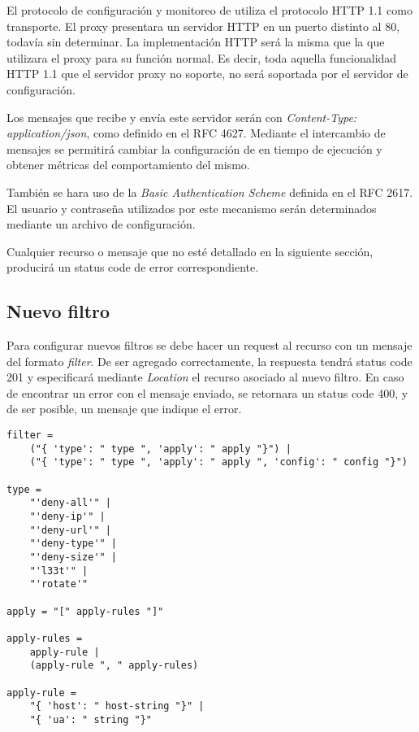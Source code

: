 \documentclass[11pt,a4paper,titlepage]{article}
\begin{document}
El protocolo de configuración y monitoreo de \duta utiliza el protocolo HTTP 1.1 como transporte.
El proxy presentara un servidor HTTP en un puerto distinto al 80, todavía sin determinar.
La implementación HTTP será la misma que la que utilizara el proxy para su función normal.
Es decir, toda aquella funcionalidad HTTP 1.1 que el servidor proxy no soporte, no será soportada por el servidor de configuración.

Los mensajes que recibe y envía este servidor serán con \textit{Content-Type: application/json}, como definido en el RFC 4627.
Mediante el intercambio de mensajes se permitirá cambiar la configuración de \duta en tiempo de ejecución y obtener métricas del comportamiento del mismo.

También se hara uso de la \textit{Basic Authentication Scheme} definida en el RFC 2617.
El usuario y contraseña utilizados por este mecanismo serán determinados mediante un archivo de configuración.

Cualquier recurso o mensaje que no esté detallado en la siguiente sección, producirá un status code de error correspondiente.

\subsection{Nuevo filtro}
\label{sec:new-filter}
Para configurar nuevos filtros se debe hacer un request  al recurso  con un mensaje del formato \textit{filter}.
De ser agregado correctamente, la respuesta tendrá status code 201 y especificará mediante \textit{Location} el recurso asociado al nuevo filtro.
En caso de encontrar un error con el mensaje enviado, se retornara un status code 400, y de ser posible, un mensaje que indique el error.

\begin{verbatim}
filter = 
    ("{ 'type': " type ", 'apply': " apply "}") | 
    ("{ 'type': " type ", 'apply': " apply ", 'config': " config "}")

type = 
    "'deny-all'" |
    "'deny-ip'" |
    "'deny-url'" |
    "'deny-type'" |
    "'deny-size'" |
    "'l33t'" |
    "'rotate'"

apply = "[" apply-rules "]"

apply-rules = 
    apply-rule |
    (apply-rule ", " apply-rules)

apply-rule = 
    "{ 'host': " host-string "}" |
    "{ 'ua': " string "}"

\end{verbatim}
\end{document}
